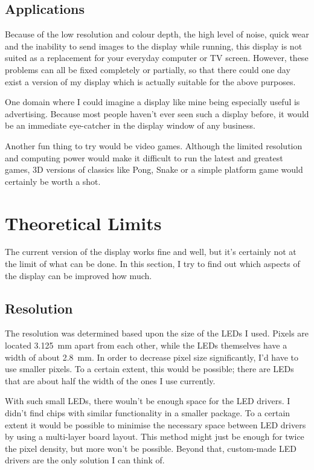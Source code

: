\documentclass[a4paper, 11pt, titlepage]{report}
\begin{document}
\subsection{Applications}

Because of the low resolution and colour depth, the high level of noise, quick wear and the
inability to send images to the display while running, this display is not suited as a replacement
for your everyday computer or TV screen. However, these problems can all be fixed completely or
partially, so that there could one day exist a version of my display which is actually suitable
for the above purposes.

One domain where I could imagine a display like mine being especially useful is advertising.
Because most people haven't ever seen such a display before, it would be an immediate eye-catcher
in the display window of any business.

Another fun thing to try would be video games. Although the limited resolution and computing power
would make it difficult to run the latest and greatest games, 3D versions of classics like Pong,
Snake or a simple platform game would certainly be worth a shot.


\section{Theoretical Limits}

The current version of the display works fine and well, but it's certainly not at the limit of
what can be done. In this section, I try to find out which aspects of the display can be improved
how much.

\subsection{Resolution}

The resolution was determined based upon the size of the LEDs I used. Pixels are located
\SI{3.125}{\milli\meter} apart from each other, while the LEDs themselves have a width of about
\SI{2.8}{\milli\meter}. In order to decrease pixel size significantly, I'd have to use smaller
pixels. To a certain extent, this would be possible; there are LEDs that are about half the width
of the ones I use currently.

With such small LEDs, there wouln't be enough space for the LED drivers. I didn't find chips with
similar functionality in a smaller package. To a certain extent it would be possible to minimise
the necessary space between LED drivers by using a multi-layer board layout. This method might
just be enough for twice the pixel density, but more won't be possible. Beyond that, custom-made
LED drivers are the only solution I can think of.
\end{document}
